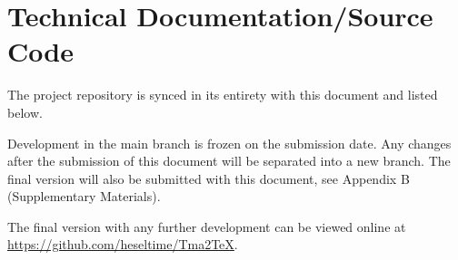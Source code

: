 \chapter{Technical Documentation/Source Code}
\label{app:Source}


The project repository is synced in its entirety with this document and listed below. 

Development in the main branch is frozen on the submission date. Any changes after the submission of this document will be separated into a new branch. The final version will also be submitted with this document, see Appendix B (Supplementary Materials).


The final version with any further development can be viewed online at \url{https://github.com/heseltime/Tma2TeX}.


